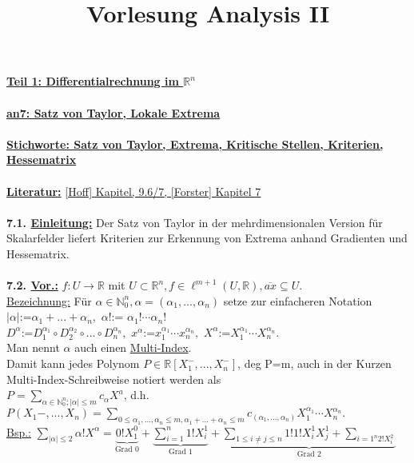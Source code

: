 \documentclass[]{scrartcl}
\title{Vorlesung Analysis II}
\begin{document}
	\textbf{\underline{Teil 1: Differentialrechnung im $\mathbb{R}^n$}}\\
	\\
	\textbf{\underline{an7: Satz von Taylor, Lokale Extrema}}\\
	\\
	\textbf{\underline{\underline{Stichworte:} Satz von Taylor, Extrema, 
	Kritische Stellen, Kriterien, Hessematrix}}\\
	\\
	\textbf{\underline{Literatur:}} \ul{[Hoff] Kapitel, 9.6/7, 
	[Forster] Kapitel 7}\\
	\\
	\textbf{7.1. \underline{Einleitung:}} Der Satz von Taylor in der 
	mehrdimensionalen Version für Skalarfelder liefert Kriterien zur Erkennung 
	von Extrema anhand Gradienten und Hessematrix.\\
	\\
	\textbf{7.2. \underline{Vor.:}} $f:U\rightarrow \mathbb{R}$ mit 
	$U\subset\mathbb{R}^n, f \in \ell^{m+1}(U,\mathbb{R}), 
	\overline{ax}\subseteq U$.\\
	\underline{Bezeichnung:} Für $\alpha \in \mathbb{N}^n_0, 
	\alpha=(\alpha_1,...,\alpha_n)$ setze zur einfacheren Notation\\
	\ul{$|\alpha|$}:=$\alpha_1+...+\alpha_n,$ 
	\ul{$\alpha!$}:= $\alpha_1!\cdots\alpha_n!$\\
	\ul{$D^\alpha$}:=$D_1^{\alpha_1}\circ D_2^{\alpha_2}\circ...\circ 
	D_n^{\alpha_n},$ \ul{$x^\alpha$}:=$x_1^{\alpha_1}\cdots x_n^{\alpha_n},$ 
	\ul{$X^{\alpha}$}:=$X_1^{\alpha_1}\cdots X_n^{\alpha_n}.$\\
	Man nennt $\alpha$ auch einen \ul{Multi-Index}.\\
	Damit kann jedes Polynom $P\in\mathbb{R}[X_1^-,...,X_n^-]$, deg P=m, auch 
	in der Kurzen Multi-Index-Schreibweise notiert werden als\\
	$P=\sum_{\alpha\in\mathbb{N}_0^n;|\alpha|\leq m} c_\alpha X^{a}$, d.h. 
	$P(X_1-,...,X_n)=\sum_{0\leq \alpha_1,...,\alpha_n\leq m, 
	\alpha_1+...+\alpha_n\leq m} 
	c_{(\alpha_1,...,\alpha_n)}X_1^{\alpha_1}\cdots X_n^{\alpha_n}.$\\
	\underline{Bsp.:} $\sum_{|\alpha|\leq 2} \alpha! 
	X^\alpha=\underbrace{0!X_1^0}_{\text{Grad 
	0}}+\underbrace{\sum_{i=1}^{n}1!X_i^1}_{\text{Grad 
	1}}+\underbrace{\sum_{1\leq i\neq j\leq 
	n}1!1!X_i^1X_j^1+\sum_{i=1^n2!X_i^2}}_{\text{Grad 2}}$\\
	\\
\end{document}
